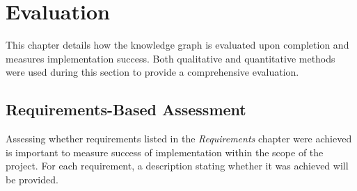 \chapter{Evaluation}
This chapter details how the knowledge graph is evaluated upon completion and measures implementation success. Both qualitative and quantitative methods were used during this section to provide a comprehensive evaluation.

\section{Requirements-Based Assessment}
\hspace{0.5cm} Assessing whether requirements listed in the \textit{Requirements} chapter were achieved is important to measure success of implementation within the scope of the project. For each requirement, a description stating whether it was achieved will be provided. 

